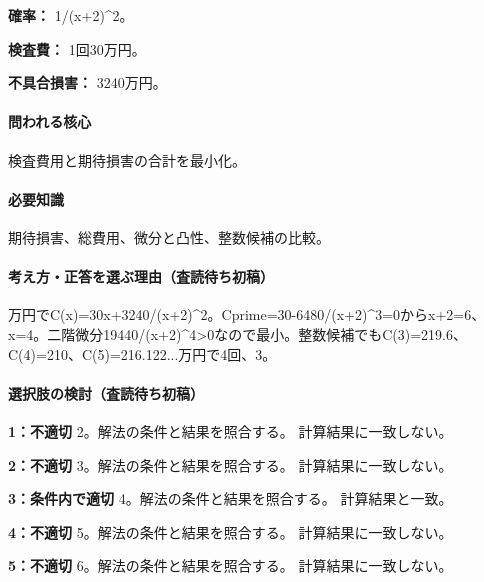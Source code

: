 \noindent\textbf{確率：} 1/(x+2)\textasciicircum{}2。\par

\noindent\textbf{検査費：} 1回30万円。\par

\noindent\textbf{不具合損害：} 3240万円。\par

\paragraph{問われる核心} 検査費用と期待損害の合計を最小化。

\paragraph{必要知識} 期待損害、総費用、微分と凸性、整数候補の比較。

\paragraph{考え方・正答を選ぶ理由（査読待ち初稿）} 万円でC(x)=\allowbreak{}30x+3240/(x+2)\textasciicircum{}2。Cprime=\allowbreak{}30-6480/(x+2)\textasciicircum{}3=\allowbreak{}0からx+2=\allowbreak{}6、x=\allowbreak{}4。二階微分19440/(x+2)\textasciicircum{}4>0なので最小。整数候補でもC(3)=\allowbreak{}219.6、C(4)=\allowbreak{}210、C(5)=\allowbreak{}216.122...万円で4回、3。

\paragraph{選択肢の検討（査読待ち初稿）}\mbox{}\par

\noindent\textbf{1：不適切} 2。解法の条件と結果を照合する。 計算結果に一致しない。\par

\noindent\textbf{2：不適切} 3。解法の条件と結果を照合する。 計算結果に一致しない。\par

\noindent\textbf{3：条件内で適切} 4。解法の条件と結果を照合する。 計算結果と一致。\par

\noindent\textbf{4：不適切} 5。解法の条件と結果を照合する。 計算結果に一致しない。\par

\noindent\textbf{5：不適切} 6。解法の条件と結果を照合する。 計算結果に一致しない。\par


